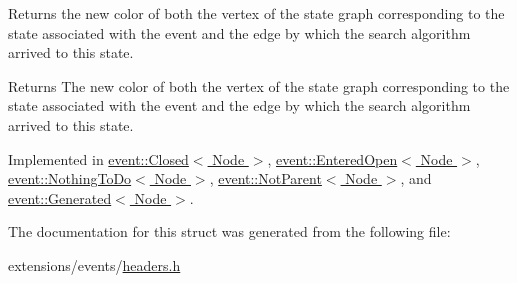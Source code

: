 Returns the new color of both the vertex of the state graph corresponding to the state associated with the event and the edge by which the search algorithm arrived to this state. 

\begin{DoxyReturn}{Returns}
The new color of both the vertex of the state graph corresponding to the state associated with the event and the edge by which the search algorithm arrived to this state. 
\end{DoxyReturn}


Implemented in \hyperlink{structevent_1_1Closed_a9476c4920a50603a2c665cd52af8a506}{event\+::\+Closed$<$ Node $>$}, \hyperlink{structevent_1_1EnteredOpen_a248e387dece4529a5179ec42bbae0f4d}{event\+::\+Entered\+Open$<$ Node $>$}, \hyperlink{structevent_1_1NothingToDo_ab8f3ffc4b17738b584fa0c479cdc90ff}{event\+::\+Nothing\+To\+Do$<$ Node $>$}, \hyperlink{structevent_1_1NotParent_a9fabd60ffa7bc15d55e27741a95b20d1}{event\+::\+Not\+Parent$<$ Node $>$}, and \hyperlink{structevent_1_1Generated_a034cc627ec1fc3c92159f8282c400625}{event\+::\+Generated$<$ Node $>$}.



The documentation for this struct was generated from the following file\+:\begin{DoxyCompactItemize}
\item 
extensions/events/\hyperlink{extensions_2events_2headers_8h}{headers.\+h}\end{DoxyCompactItemize}
